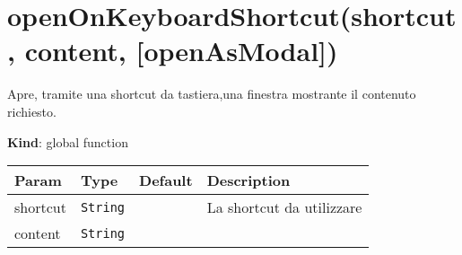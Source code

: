 \hypertarget{openonkeyboardshortcutshortcut-content-openasmodal}{%
\section{openOnKeyboardShortcut(shortcut, content,
{[}openAsModal{]})}\label{openonkeyboardshortcutshortcut-content-openasmodal}}

Apre, tramite una shortcut da tastiera,una finestra mostrante il
contenuto richiesto.

\textbf{Kind}: global function

\begin{longtabu} to \textwidth {X[1,L,m]X[1,L,m]X[1.5,L,m]X[1.5,L,m]}
\toprule
\begin{minipage}[b]{0.22\columnwidth}\raggedright
Param\strut
\end{minipage} & \begin{minipage}[b]{0.22\columnwidth}\raggedright
Type\strut
\end{minipage} & \begin{minipage}[b]{0.22\columnwidth}\raggedright
Default\strut
\end{minipage} & \begin{minipage}[b]{0.22\columnwidth}\raggedright
Description\strut
\end{minipage}\tabularnewline
\midrule
\endhead
\begin{minipage}[t]{0.22\columnwidth}\raggedright
shortcut\strut
\end{minipage} & \begin{minipage}[t]{0.22\columnwidth}\raggedright
\texttt{String}\strut
\end{minipage} & \begin{minipage}[t]{0.22\columnwidth}\raggedright
\strut
\end{minipage} & \begin{minipage}[t]{0.22\columnwidth}\raggedright
La shortcut da utilizzare\strut
\end{minipage}\tabularnewline
\begin{minipage}[t]{0.22\columnwidth}\raggedright
content\strut
\end{minipage} & \begin{minipage}[t]{0.22\columnwidth}\raggedright
\texttt{String}\strut
\end{minipage} & \begin{minipage}[t]{0.22\columnwidth}\raggedright
\strut
\end{minipage} & \begin{minipage}[t]{0.22\columnwidth}\raggedright

\end{minipage}
\end{longtabu}
